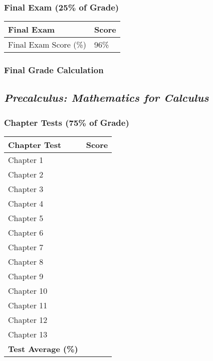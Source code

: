 \documentclass[11pt, letterpaper]{article}
\begin{document}
\subsubsection*{Final Exam (25\% of Grade)}
\begin{tabular}{|p{6cm}|p{3cm}|}
\hline
\textbf{Final Exam} & \textbf{Score} \\
\hline
Final Exam Score (\%) & 96\% \\
\hline
\end{tabular}

\subsubsection*{Final Grade Calculation}

\subsection*{\textit{Precalculus: Mathematics for Calculus}}
\subsubsection*{Chapter Tests (75\% of Grade)}
\begin{tabular}{|p{6cm}|p{3cm}|}
\hline
\textbf{Chapter Test} & \textbf{Score} \\
\hline
Chapter 1 & \\ \hline
Chapter 2 & \\ \hline
Chapter 3 & \\ \hline
Chapter 4 & \\ \hline
Chapter 5 & \\ \hline
Chapter 6 & \\ \hline
Chapter 7 & \\ \hline
Chapter 8 & \\ \hline
Chapter 9 & \\ \hline
Chapter 10 & \\ \hline
Chapter 11 & \\ \hline
Chapter 12 & \\ \hline
Chapter 13 & \\ \hline
\textbf{Test Average (\%)} & \\
\hline
\end{tabular}
\end{document}
